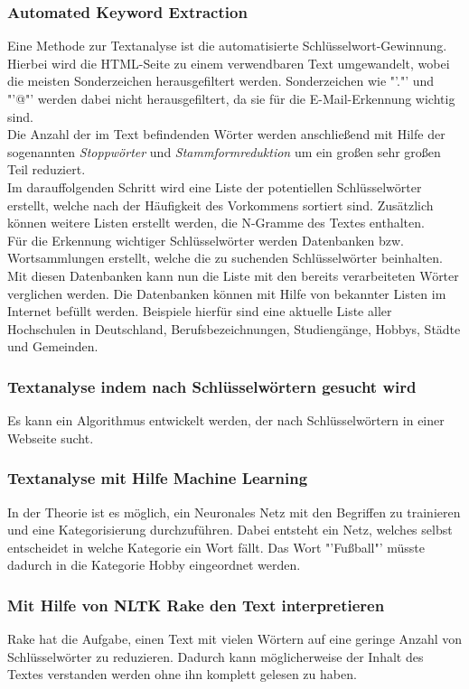 		\subsubsection{Automated Keyword Extraction}
		Eine Methode zur Textanalyse ist die automatisierte Schlüsselwort-Gewinnung. Hierbei wird die HTML-Seite zu einem verwendbaren Text umgewandelt, wobei die meisten Sonderzeichen herausgefiltert werden. Sonderzeichen wie "'."' und "'@"' werden dabei nicht herausgefiltert, da sie für die E-Mail-Erkennung wichtig sind.\\
		Die Anzahl der im Text befindenden Wörter werden anschließend mit Hilfe der sogenannten \textit{Stoppwörter} und \textit{Stammformreduktion} um ein großen sehr großen Teil reduziert.\\
		Im darauffolgenden Schritt wird eine Liste  der potentiellen Schlüsselwörter erstellt, welche nach der Häufigkeit des Vorkommens sortiert sind. Zusätzlich können weitere Listen erstellt werden, die N-Gramme des Textes enthalten.\\
		Für die Erkennung wichtiger Schlüsselwörter werden Datenbanken bzw. Wortsammlungen erstellt, welche die zu suchenden Schlüsselwörter beinhalten. Mit diesen Datenbanken kann nun die Liste mit den bereits verarbeiteten Wörter verglichen werden. Die Datenbanken können mit Hilfe von bekannter Listen im Internet befüllt werden. Beispiele hierfür sind eine aktuelle Liste aller Hochschulen in Deutschland, Berufsbezeichnungen, Studiengänge, Hobbys, Städte und Gemeinden.
		
		\subsubsection{Textanalyse indem nach Schlüsselwörtern gesucht wird}
		Es kann ein Algorithmus entwickelt werden, der nach Schlüsselwörtern in einer Webseite sucht. 
		\subsubsection{Textanalyse mit Hilfe Machine Learning}
		In der Theorie ist es möglich, ein Neuronales Netz mit den Begriffen zu trainieren und eine Kategorisierung durchzuführen. Dabei entsteht ein Netz, welches selbst entscheidet in welche Kategorie ein Wort fällt. Das Wort "'Fußball"' müsste dadurch in die Kategorie Hobby eingeordnet werden.
		\subsubsection{Mit Hilfe von NLTK Rake den Text interpretieren}
		Rake hat die Aufgabe, einen Text mit vielen Wörtern auf eine geringe Anzahl von Schlüsselwörter zu reduzieren. Dadurch kann möglicherweise der Inhalt des Textes verstanden werden ohne ihn komplett gelesen zu haben.
